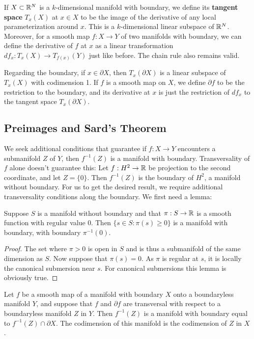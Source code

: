 If $X \subset \mathbb{R}^N$ is a $k$-dimensional manifold with boundary, we define its \textbf{tangent space} $T_x(X)$ at $x \in X$ to be the image of the derivative of any local parameterization around $x$. This is a $k$-dimensional linear subspace of $\mathbb{R}^N$. Moreover, for a smooth map $f: X \to Y$ of two manifolds with boundary, we can define the derivative of $f$ at $x$ as a linear transformation $df_x: T_x(X) \to T_{f(x)}(Y)$ just like before. The chain rule also remains valid.

Regarding the boundary, if $x \in \partial X$, then $T_x(\partial X)$ is a linear subspace of $T_x(X)$ with codimension 1. If $f$ is a smooth map on $X$, we define $\partial f$ to be the restriction to the boundary, and its derivative at $x$ is just the restriction of $df_x$ to the tangent space $T_x(\partial X)$. 

\subsection{Preimages and Sard's Theorem}

We seek additional conditions that guarantee if $f: X \to Y$ encounters a submanifold $Z$ of $Y$, then $f^{-1}(Z)$ is a manifold with boundary. Transversality of $f$ alone doesn't guarantee this: Let $f: H^2 \to \mathbb{R}$ be projection to the second coordinate, and let $Z = \{0\}$. Then $f^{-1}(Z)$ is the boundary of $H^2$, a manifold without boundary. For us to get the desired result, we require additional transversality conditions along the boundary. We first need a lemma:

\begin{lemma}
    Suppose $S$ is a manifold without boundary and that $\pi: S \to \mathbb{R}$ is a smooth function with regular value 0. Then $\{s \in S : \pi(s) \geq 0\}$ is a manifold with boundary, with boundary $\pi^{-1}(0)$. 
\end{lemma}

\begin{proof}
    The set where $\pi > 0$ is open in $S$ and is thus a submanifold of the same dimension as $S$. Now suppose that $\pi(s) = 0$. As $\pi$ is regular at $s$, it is locally the canonical submersion near $s$. For canonical submersions this lemma is obviously true. 
\end{proof}

\begin{theorem}
    Let $f$ be a smooth map of a manifold with boundary $X$ onto a boundaryless manifold $Y$, and suppose that $f$ and $\partial f$ are transversal with respect to a boundaryless manifold $Z$ in $Y$. Then $f^{-1}(Z)$ is a manifold with boundary equal to $f^{-1}(Z) \cap \partial X$. The codimension of this manifold is the codimension of $Z$ in $X$.
\end{theorem}

